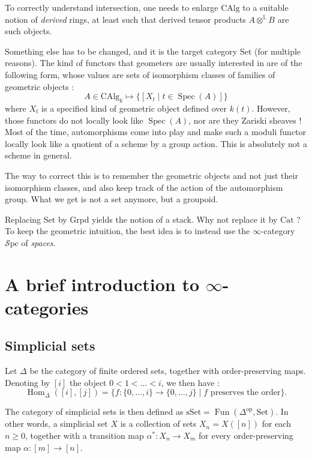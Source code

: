 \documentclass[11pt]{article}
\theoremstyle{definition}
\renewcommand{\L}{\mathbb{L}}
\newcommand{\CAlg}{\mathrm{CAlg}}
\newcommand{\Set}{\mathrm{Set}}
\newcommand{\sSet}{\mathrm{sSet}}
\newcommand{\Grpd}{\mathrm{Grpd}}
\newcommand{\Spc}{\mathcal{S}\mathrm{pc}}
\DeclareMathOperator{\Spec}{Spec}
\newcommand{\Cat}{\mathrm{Cat}}
\DeclareMathOperator{\Hom}{Hom}
\DeclareMathOperator{\Fun}{Fun}
\newcommand{\op}{\mathrm{op}}
\begin{document}
To correctly understand intersection, one needs to enlarge $\CAlg$ to a suitable notion of \emph{derived} rings, at least such that derived tensor products $A \otimes^{\L} B$ are such objects.

Something else has to be changed, and it is the target category $\Set$ (for multiple reasons). The kind of functors that geometers are usually interested in are of the following form, whose values are sets of isomorphism classes of families of geometric objects :
$$A \in \CAlg_k \mapsto \{[X_t \mid t \in \Spec(A)]\}$$
where $X_t$ is a specified kind of geometric object defined over $k(t)$. However, those functors do not locally look like $\Spec(A)$, nor are they Zariski sheaves ! Most of the time, automorphisms come into play and make such a moduli functor locally look like a quotient of a scheme by a group action. This is absolutely not a scheme in general.

The way to correct this is to remember the geometric objects and not just their isomorphism classes, and also keep track of the action of the automorphism group. What we get is not a set anymore, but a groupoid.

Replacing $\Set$ by $\Grpd$ yields the notion of a stack. Why not replace it by $\Cat$ ? To keep the geometric intuition, the best idea is to instead use the $\infty$-category $\Spc$ of \emph{spaces}.

\section{A brief introduction to $\infty$-categories}

\subsection{Simplicial sets}

Let $\Delta$ be the category of finite ordered sets, together with order-preserving maps. Denoting by $[i]$ the object ${0 < 1 < \dots < i}$, we then have :
$$\Hom_{\Delta}([i], [j]) = \{f : \{0, \dots, i\} \to \{0, \dots, j\} \mid f \text{ preserves the order}\}.$$

The category of simplicial sets is then defined as $\sSet = \Fun(\Delta^{\op}, \Set)$. In other words, a simplicial set $X$ is a collection of sets $X_n = X([n])$ for each $n \geq 0$, together with a transition map $\alpha^* : X_n \to X_m$ for every order-preserving map $\alpha : [m] \to [n]$.
\end{document}
